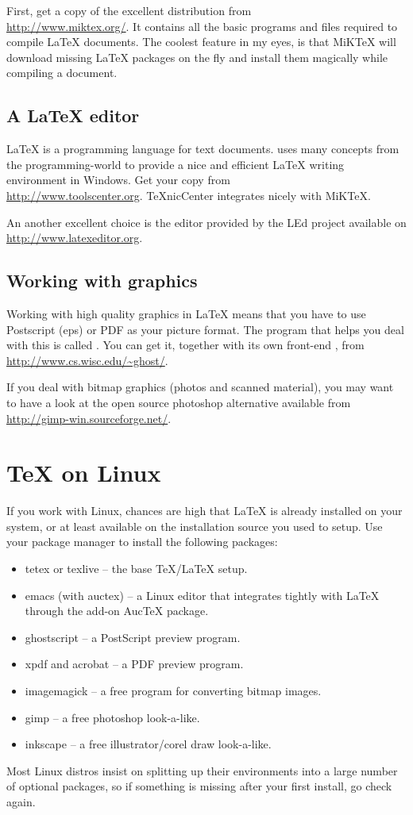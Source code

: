 First, get a copy of the excellent  distribution from\\
\url{http://www.miktex.org/}. It contains all the basic programs and files
required to compile \LaTeX{} documents.  The coolest feature in my eyes, is
that MiKTeX will download missing \LaTeX{} packages on the fly and install them
magically while compiling a document.

\subsection{A \LaTeX{} editor}

\LaTeX{} is a programming language for text documents. 
uses many concepts from the programming-world to provide a nice and
efficient \LaTeX{} writing environment in Windows. Get your copy from\\
\url{http://www.toolscenter.org}. TeXnicCenter integrates nicely with
MiKTeX.

An another excellent choice is the editor provided by the LEd project available on
\url{http://www.latexeditor.org}.

\subsection{Working with graphics}

Working with high quality graphics in \LaTeX{} means that you have to use
Postscript (eps) or PDF as your picture format. The program that helps you
deal with this is called . You can get it, together with its
own front-end , from \url{http://www.cs.wisc.edu/~ghost/}.

If you deal with bitmap graphics (photos and scanned material), you may want
to have a look at the open source photoshop alternative  available
from \url{http://gimp-win.sourceforge.net/}.

\section{\TeX{} on Linux}

If you work with Linux, chances are high that \LaTeX{} is already installed
on your system, or at least available on the installation source you used to
setup. Use your package manager to install the following packages:

\begin{itemize}
\item tetex or texlive -- the base \TeX{}/\LaTeX{} setup.
\item emacs (with auctex) -- a Linux editor that integrates tightly with \LaTeX{} through the add-on AucTeX package.
\item ghostscript -- a PostScript preview program.
\item xpdf and acrobat -- a PDF preview program.
\item imagemagick -- a free program for converting bitmap images.
\item gimp -- a free photoshop look-a-like.
\item inkscape -- a free illustrator/corel draw look-a-like.
\end{itemize}

Most Linux distros insist on splitting up their \Tex{} environments into a
large number of optional packages, so if something is missing after your
first install, go check again.
